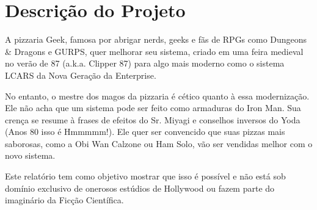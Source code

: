 \section{Descrição do Projeto}

A pizzaria Geek, famosa por abrigar nerds, geeks e fãs de RPGs como Dungeons \& Dragons e GURPS, quer melhorar seu sistema, criado em uma feira medieval no verão de 87 (a.k.a. Clipper 87) para algo mais moderno como o sistema LCARS da Nova Geração da Enterprise.

No entanto, o mestre dos magos da pizzaria é cético quanto à essa modernização. Ele não acha que um sistema pode ser feito como armaduras do Iron Man. Sua crença se resume à frases de efeitos do Sr. Miyagi e conselhos inversos do Yoda (Anos 80 isso é Hmmmmm!). Ele quer ser convencido que suas pizzas mais saborosas, como a Obi Wan Calzone ou Ham Solo, vão ser vendidas melhor com o novo sistema.

Este relatório tem como objetivo mostrar que isso é possível e não está sob domínio exclusivo de onerosos estúdios de Hollywood ou fazem parte do imaginário da Ficção Científica.